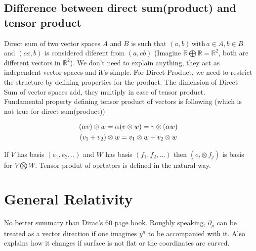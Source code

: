 \documentclass{report}
\begin{document}
\section{Difference between direct sum(product) and tensor product}

\noindent Direct sum of two vector spaces $A$ and $B$ is such that $(a,b)\, \textrm{with} \, a\in A, b\in B$ and $(ca, b)$ is considered diferent from $(a,cb)$ (Imagine $\mathbb{R}\bigoplus\mathbb{R} = \mathbb{R}^2$, both are different vectors in $\mathbb{R}^2$). We don't need to explain anything, they act as independent vector spaces and it's simple. For Direct Product, we need to restrict the structure by defining properties for the product. The dimension of Direct Sum of vector spaces add, they multiply in case of tensor product.\\

\noindent Fundamental property defining tensor product of vectors is following (which is not true for direct sum(product))

\begin{gather}
  (\alpha v) \otimes w = \alpha (v \otimes w) = v \otimes (\alpha w)\notag \\
  (v_1+v_2)\otimes w = v_1\otimes w + v_2\otimes w 
\end{gather}

\noindent If $V$ has basis $(e_1,e_2,..)$ and $W$ has basis $(f_1,f_2,...)$ then $(e_i\otimes f_j)$ is basis for $V\bigotimes W$. Tensor produt of oprtators is defined in the natural way. 

\chapter{General Relativity}
No better summary than Dirac's 60 page book. Roughly speaking, $\partial_\mu$ can be treated as a vector direction if one imagines $y^n$ to be accompanied with it. Also explains how it changes if surface is not flat or the coordinates are curved.
\end{document}

